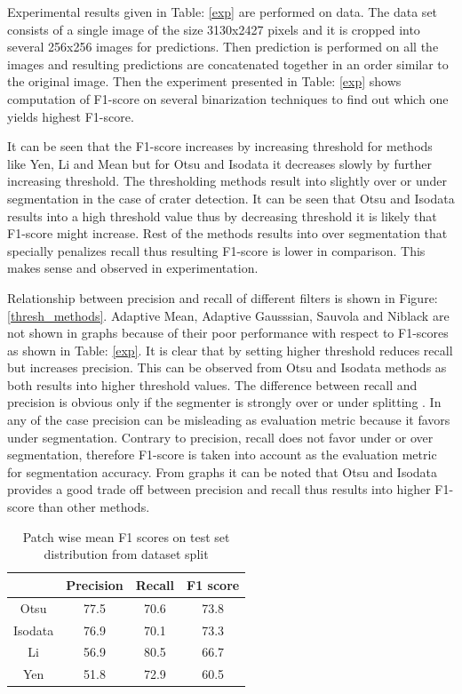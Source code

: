 \documentclass[11pt]{article}
\begin{document}
Experimental results given in Table: \ref{exp} are performed on \cite{dino2020} data. The data set consists of a single image of the size 3130x2427 pixels and it is cropped into several 256x256 images for predictions. Then prediction is performed on all the images and resulting predictions are concatenated together in an order similar to the original image. Then the experiment presented in Table: \ref{exp} shows computation of F1-score on several binarization techniques to find out which one yields highest F1-score.

It can be seen that the F1-score increases by increasing threshold for methods like Yen, Li and Mean but for Otsu and Isodata it decreases slowly by further increasing threshold. The thresholding methods result into slightly over or under segmentation in the case of crater detection. It can be seen that Otsu and Isodata results into a high threshold value thus by decreasing threshold it is likely that F1-score might increase. Rest of the methods results into over segmentation that specially penalizes recall thus resulting F1-score is lower in comparison. This makes sense and observed in experimentation.

Relationship between precision and recall of different filters is shown in Figure: \ref{thresh_methods}. Adaptive Mean, Adaptive Gausssian, Sauvola and Niblack are not shown in graphs because of their poor performance with respect to F1-scores as shown in Table: \ref{exp}. It is clear that by setting higher threshold reduces recall but increases precision. This can be observed from Otsu and Isodata methods as both results into higher threshold values. The difference between recall and  precision is obvious only if the segmenter is strongly over or under splitting \cite{badrinarayanan2017segnet}. In any of the case precision can be misleading as evaluation metric because it favors under segmentation. Contrary to precision, recall does not favor under or over segmentation, therefore F1-score is taken into account as the evaluation metric for segmentation accuracy. From graphs it can be noted that Otsu and Isodata provides a good trade off between precision and recall thus results into higher F1-score than other methods.
 
\begin{table}[H]
	\centering
	\caption{Patch wise mean F1 scores on test set distribution from dataset split}
	\begin{tabular}{c|c|c|c|}
		\cline{2-4}
		\multicolumn{1}{l|}{}         & Precision & Recall & F1 score \\ \hline
		\multicolumn{1}{|c|}{Otsu}    & 77.5      & 70.6   & 73.8     \\ \hline
		\multicolumn{1}{|c|}{Isodata} & 76.9      & 70.1   & 73.3     \\ \hline
		\multicolumn{1}{|c|}{Li}      & 56.9      & 80.5   & 66.7     \\ \hline
		\multicolumn{1}{|c|}{Yen}     & 51.8      & 72.9   & 60.5     \\ \hline
	\end{tabular}
\label{mine}
\end{table}
\end{document}
